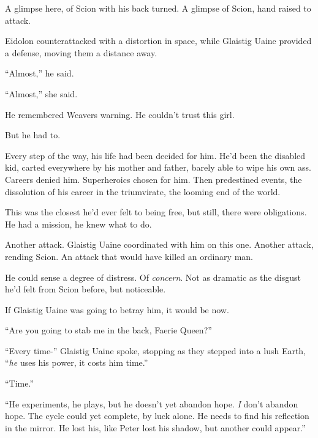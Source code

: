 A glimpse here, of Scion with his back turned.  A glimpse of Scion, hand raised to attack.



Eidolon counterattacked with a distortion in space, while Glaistig Uaine provided a defense, moving them a distance away.



``Almost,'' he said.



``Almost,'' she said.



He remembered Weavers warning.  He couldn't trust this girl.



But he had to.



Every step of the way, his life had been decided for him.  He'd been the disabled kid, carted everywhere by his mother and father, barely able to wipe his own ass.  Careers denied him.  Superheroics chosen for him.  Then predestined events, the dissolution of his career in the triumvirate, the looming end of the world.



This was the closest he'd ever felt to being free, but still, there were obligations.  He had a mission, he knew what to do.



Another attack.  Glaistig Uaine coordinated with him on this one.  Another attack, rending Scion.  An attack that would have killed an ordinary man.



He could sense a degree of distress.  Of \emph{concern}.  Not as dramatic as the disgust he'd felt from Scion before, but noticeable.



If Glaistig Uaine was going to betray him, it would be now.



``Are you going to stab me in the back, Faerie Queen?''



``Every time-'' Glaistig Uaine spoke, stopping as they stepped into a lush Earth, ``\emph{he} uses his power, it costs him time.''



``Time.''



``He experiments, he plays, but he doesn't yet abandon hope.  \emph{I} don't abandon hope.  The cycle could yet complete, by luck alone.  He needs to find his reflection in the mirror.  He lost his, like Peter lost his shadow, but another could appear.''



